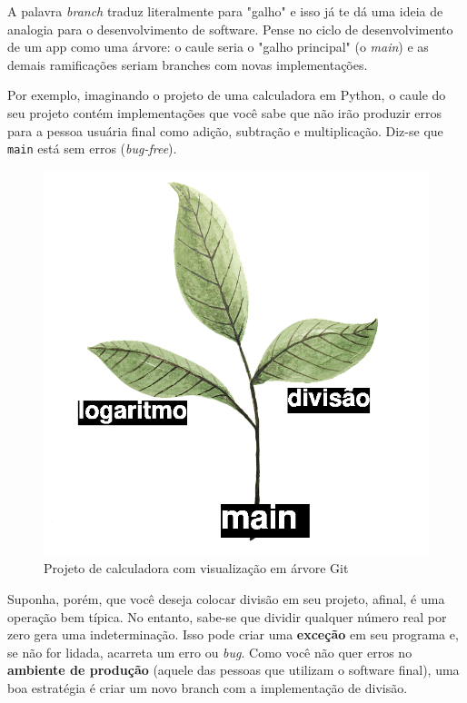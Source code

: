 \documentclass{article}
\begin{document}
	A palavra \textit{branch} traduz literalmente para "galho" e isso já te dá uma ideia de analogia para o desenvolvimento de 
	software. Pense no ciclo de desenvolvimento de um app como uma árvore: o caule seria o "galho principal" (o \textit{main})
	e as demais ramificações seriam branches com novas implementações.

	Por exemplo, imaginando o projeto de uma calculadora em Python, o caule do seu projeto contém implementações que você sabe 
	que não irão produzir erros para a pessoa usuária final como adição, subtração e multiplicação. Diz-se que \texttt{main} 
	está sem erros (\textit{bug-free}).

	\begin{figure}[ht!]
		\centering
	  	\includegraphics[scale=0.25]{figs/software_tree.png} 
		\caption*{Projeto de calculadora com visualização em árvore Git}
  	\end{figure}
	
	Suponha, porém, que você deseja colocar divisão em seu projeto, afinal, é uma operação bem típica. No entanto, sabe-se que dividir
	qualquer número real por zero gera uma indeterminação. Isso pode criar uma \textbf{exceção} em seu programa e, se não for lidada, 
	acarreta um erro ou \textit{bug}. Como você não quer erros no \textbf{ambiente de produção} (aquele das pessoas que utilizam o software final),
	uma boa estratégia é criar um novo branch com a implementação de divisão. 
\end{document}
